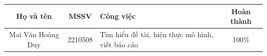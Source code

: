 \documentclass[a4paper, 11pt]{article}
\begin{document}
\newpage
\renewcommand{\arraystretch}{1.5}
\begin{tabularx}{\textwidth}{|c|c|X|c|} 
    \hline
    Họ và tên & MSSV & \centering Công việc & Hoàn thành \\ \hline
    Mai Văn Hoàng Duy & 2210508 & Tìm hiểu đề tài, hiện thực mô hình, viết báo cáo & 100\% \\ \hline
   
\end{tabularx}


\newpage
\tableofcontents
\newpage



\newpage

\newpage

\newpage

\newpage

\newpage

\newpage

\clearpage

\end{document}
